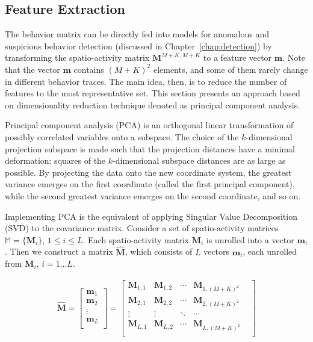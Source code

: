 
\subsection{Feature Extraction}
\label{sec:ba:PCA}

The behavior matrix can be directly fed into models for anomalous and suspicious behavior detection (discussed in Chapter~\ref{chap:detection}) by transforming the spatio-activity matrix $\mathbf{M}^{M+K, M+K}$ to a feature vector $\mathbf{m}$. Note that the vector $\mathbf{m}$ contains $(M+K)^2$ elements, and some of them rarely change in different behavior traces. The main idea, then, is to reduce the number of features to the most representative set. This section presents an approach based on dimensionality reduction technique denoted as principal component analysis.

Principal component analysis (PCA) is an orthogonal linear transformation of possibly correlated variables onto a subspace. The choice of the $k$-dimensional projection subspace is made such that the projection distances have a minimal deformation: squares of the  $k$-dimensional subspace distances are as large as possible. By projecting the data onto the new coordinate system, the greatest variance emerges on the first coordinate (called the first principal component), while the second greatest variance emerges on the second coordinate, and so on.

Implementing PCA is the equivalent of applying Singular Value Decomposition (SVD) to the covariance matrix. Consider a set of spatio-activity matrices $\mathbb{M}=\{\mathbf{M}_i\}$, $1 \leq i \leq L$.
Each spatio-activity matrix $\mathbf{M}_i$ is unrolled into a vector $\mathbf{m}_i$. Then we construct a matrix $\mathbf{\widehat M}$, which consists of $L$ vectors $\mathbf{m}_i$, each unrolled from $\mathbf{M}_i$, $i=1...L$.

\begin{eqnarray}
\mathbf{\widehat M} = \begin{bmatrix}
		\mathbf{m}_1 \\
		\mathbf{m}_2 \\
		\vdots \\
		\mathbf{m}_L \\
	\end{bmatrix} = \begin{bmatrix}
		\mathbf{M}_{1,1} & \mathbf{M}_{1,2} & \cdots & \mathbf{M}_{1, (M+K)^2} & \\
		\mathbf{M}_{2,1} & \mathbf{M}_{2,2} & \cdots & \mathbf{M}_{2, (M+K)^2} & \\
		\vdots 			 &	\vdots			& \ddots & \cdots \\
		\mathbf{M}_{L,1} & \mathbf{M}_{L,2} & \cdots & \mathbf{M}_{L, (M+K)^2} & \\
	\end{bmatrix}
\end{eqnarray}

